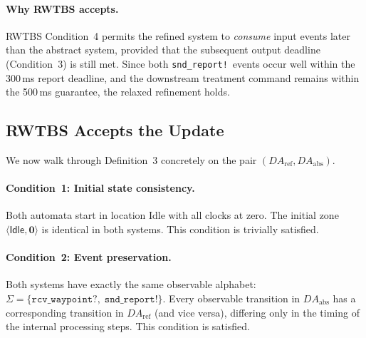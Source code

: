 \documentclass[11pt,a4paper]{article}
\newcommand{\DAabs}{\mathit{DA}_{\mathrm{abs}}}
\newcommand{\DAref}{\mathit{DA}_{\mathrm{ref}}}
\newcommand{\RWTBS}{RWTBS}
\begin{document}
\paragraph{Why RWTBS accepts.}
\RWTBS{} Condition~4 permits the refined system to \emph{consume} input events
later than the abstract system, provided that the subsequent output deadline
(Condition~3) is still met.  Since both \texttt{snd\_report!}\ events occur
well within the 300\,ms report deadline, and the downstream treatment command
remains within the 500\,ms guarantee, the relaxed refinement holds.

\subsection{RWTBS Accepts the Update}
\label{sec:rwtbs-accepts}

We now walk through Definition~3 concretely on the pair
$(\DAref, \DAabs)$.

\paragraph{Condition~1: Initial state consistency.}
Both automata start in location \textsf{Idle} with all clocks at zero.  The
initial zone $\langle \textsf{Idle}, \mathbf{0} \rangle$ is identical in both
systems.  This condition is trivially satisfied.

\paragraph{Condition~2: Event preservation.}
Both systems have exactly the same observable alphabet:
$\Sigma = \{\texttt{rcv\_waypoint?},\; \texttt{snd\_report!}\}$.  Every
observable transition in $\DAabs$ has a corresponding transition in $\DAref$
(and vice versa), differing only in the timing of the internal processing
steps.  This condition is satisfied.
\end{document}
